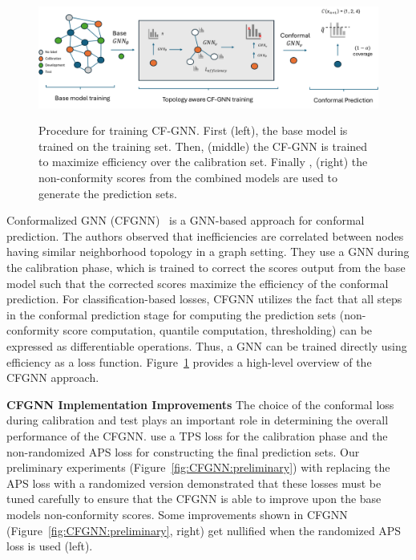 \begin{figure}
    \centering
    \includegraphics[width=\linewidth,alt={CF-GNN three stage training procedure.}]{graphConformal/figures/CFGNN.pdf}
    \caption{Procedure for training CF-GNN. First (left), the base model is trained on the training set. Then, (middle) the CF-GNN is trained to maximize efficiency over the calibration set. Finally , (right) the non-conformity scores from the combined models are used to generate the prediction sets.}
    \label{fig:conformalized_gnn}
\end{figure}

Conformalized GNN (CFGNN)~\citep{huang2024uncertainty} is a GNN-based approach for conformal prediction.
The authors observed that inefficiencies are correlated between nodes having similar neighborhood topology in a graph setting.
They use a GNN during the calibration phase, which is trained to correct the scores output from the base model such that the corrected scores maximize the efficiency of the conformal prediction.
For classification-based losses, CFGNN utilizes the fact that all steps in the conformal prediction stage for computing the prediction sets (non-conformity score computation, quantile computation, thresholding) can be expressed as differentiable operations.
Thus, a GNN can be trained directly using efficiency as a loss function.
Figure~\ref{fig:conformalized_gnn} provides a high-level overview of the CFGNN approach.

\noindent \textbf{CFGNN Implementation Improvements}
The choice of the conformal loss during calibration and test plays an important role in determining the overall performance of the CFGNN.
\citet{huang2024uncertainty} use a TPS loss for the calibration phase and the non-randomized APS loss for constructing the final prediction sets.
Our preliminary experiments (Figure~\ref{fig:CFGNN:preliminary}) with replacing the APS loss with a randomized version demonstrated that these losses must be tuned carefully to ensure that the CFGNN is able to improve upon the base models non-conformity scores.
Some improvements shown in CFGNN (Figure~\ref{fig:CFGNN:preliminary}, right) get nullified when the randomized APS loss is used (left).

